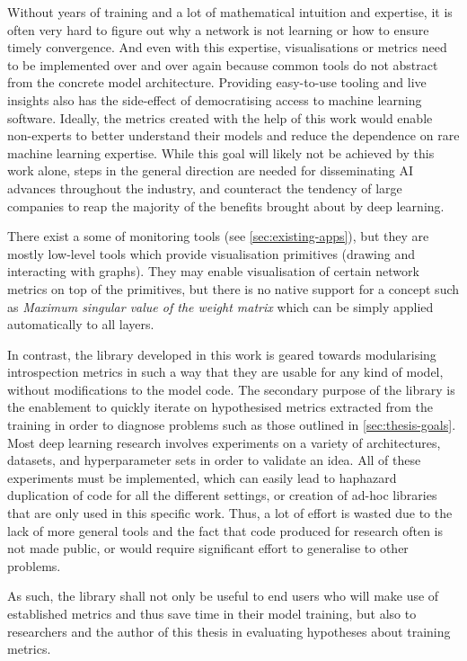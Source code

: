 Without years of training and a lot of
mathematical intuition and expertise, it is often very hard to figure out why a
network is not learning or how to ensure timely convergence.  And even with this
expertise, visualisations or metrics need to be implemented over and over again
because common tools do not abstract from the concrete model architecture.
Providing easy-to-use tooling and live insights also has the side-effect of
democratising access to machine learning software. Ideally, the metrics created
with the help of this work would enable non-experts to better understand their
models and reduce the dependence on rare machine learning expertise. While this
goal will likely not be achieved by this work alone, steps in the general
direction are needed for disseminating AI advances throughout the industry, and
counteract the tendency of large companies to reap the majority of the benefits
brought about by deep learning.

There exist a some of monitoring tools (see \cref{sec:existing-apps}), but they
are mostly low-level tools which provide visualisation primitives (drawing and
interacting with graphs). They may enable visualisation of certain network
metrics on top of the primitives, but there is no native support for a concept
such as \emph{Maximum singular value of the weight matrix} which can be simply
applied automatically to all layers.

In contrast, the library developed in this work is geared towards modularising
introspection metrics in such a way that they are usable for any kind of model,
without modifications to the model code. The secondary purpose of the library is
the enablement to quickly iterate on hypothesised metrics extracted from the
training in order to diagnose problems such as those outlined in
\cref{sec:thesis-goals}. Most deep learning research involves experiments on a
variety of architectures, datasets, and hyperparameter sets in order to validate
an idea. All of these experiments must be implemented, which can easily lead to
haphazard duplication of code for all the different settings, or creation of
ad-hoc libraries that are only used in this specific work. Thus, a lot of effort
is wasted due to the lack of more general tools and the fact that code produced
for research often is not made public, or would require significant effort to
generalise to other problems.

As such, the library shall not only be useful to end users who will make use of
established metrics and thus save time in their model training, but also to
researchers and the author of this thesis in evaluating hypotheses about
training metrics.

